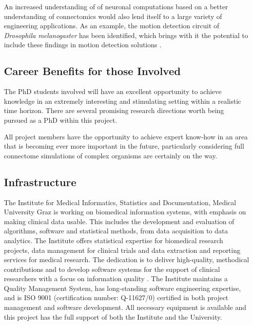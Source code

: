 \documentclass[a4paper,11pt]{article}
\begin{document}
An increased understanding of of neuronal computations based on a better understanding of connectomics would also lend itself to a large variety of engineering applications. As an example, the motion detection circuit of \emph{Drosophila melanogaster} has been identified, which brings with it the potential to include these findings in motion detection solutions \citep{Takemura2013}. 

\subsection{Career Benefits for those Involved}

The PhD students involved will have an excellent opportunity to achieve knowledge in an extremely interesting and stimulating setting within a realistic time horizon. There are several promising research directions worth being pursued as a PhD within this project. 

All project members have the opportunity to achieve expert know-how in an area that is becoming ever more important in the future, particularly considering full connectome simulations of complex organisms are certainly on the way.

\subsection{Infrastructure} 

The Institute for Medical Informatics, Statistics and Documentation, Medical University Graz is working on biomedical information systems, with emphasis on making clinical data usable. This includes the development and evaluation of algorithms, software and statistical methods, from data acquisition to data analytics. The Institute offers statistical expertise for biomedical research projects, data management for clinical trials and data extraction and reporting services for medical research. The dedication is to deliver high-quality, methodical contributions and to develop software systems for the support of clinical researchers with a focus on information quality \citep{Holzinger:2011:InformationQuality}. The Institute maintains a Quality Management System, has long-standing software engineering expertise, and is ISO 9001 (certification number: Q-11627/0) certified in both project management and software development. All necessary equipment is available and this project has the full support of both the Institute and the University.
\end{document}

